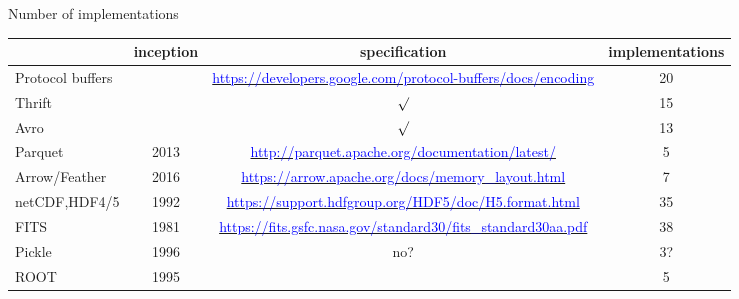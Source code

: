 \documentclass[aspectratio=169]{beamer}
\begin{document}
\begin{frame}{Number of implementations}
\vspace{0.25 cm}
\begin{center}
\renewcommand{\arraystretch}{1.5}
\begin{tabular}{l c c c}
& inception & specification & implementations \\\hline
Protocol buffers &  & \href{https://developers.google.com/protocol-buffers/docs/encoding}{\textcolor{blue}{\tiny https://developers.google.com/protocol-buffers/docs/encoding}} & 20 \\
Thrift &  & $\surd$ & 15 \\
Avro &  & $\surd$ & 13 \\
Parquet & 2013 & \href{http://parquet.apache.org/documentation/latest/}{\textcolor{blue}{\tiny http://parquet.apache.org/documentation/latest/}} & 5 \\
Arrow/Feather & 2016 & \href{https://arrow.apache.org/docs/memory_layout.html}{\textcolor{blue}{\tiny https://arrow.apache.org/docs/memory\_layout.html}} & 7 \\
netCDF,HDF4/5 & 1992 & \href{https://support.hdfgroup.org/HDF5/doc/H5.format.html}{\textcolor{blue}{\tiny https://support.hdfgroup.org/HDF5/doc/H5.format.html}} & 35 \\
FITS & 1981 & \href{https://fits.gsfc.nasa.gov/standard30/fits_standard30aa.pdf}{\textcolor{blue}{\tiny https://fits.gsfc.nasa.gov/standard30/fits\_standard30aa.pdf}} & 38 \\
Pickle & 1996 & no? & 3? \\
ROOT & 1995 & & 5
\end{tabular}
\end{center}
\end{frame}

\href{}{\textcolor{blue}{\tiny }}
\end{document}
